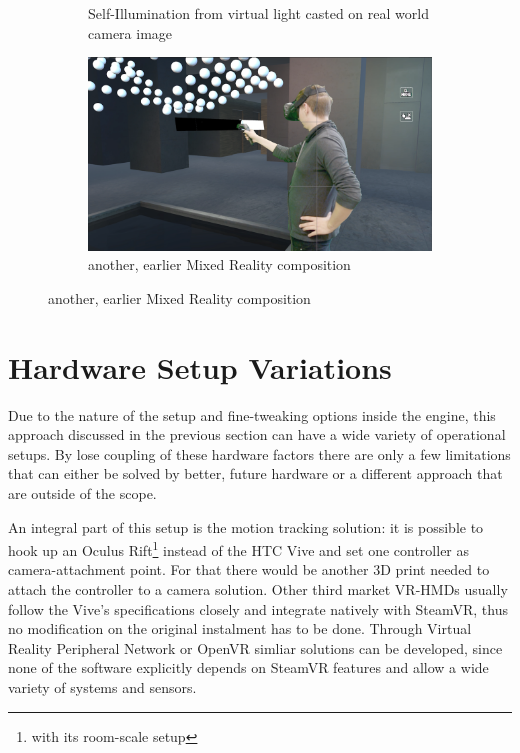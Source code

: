 \begin{figure}[htbp]
\begin{subfigure}[t]{.49\textwidth}
		\caption{Self-Illumination from virtual light casted on real world 
			camera image}
	\end{subfigure}
	\hfill
	\begin{subfigure}[t]{.49\textwidth}
		\centering
		\includegraphics[width=\textwidth]{gfx/results/mr-action_old.png}
		\caption{another, earlier Mixed Reality composition}
	\end{subfigure}
\end{figure}

\section{Hardware Setup Variations}
\label{sec:eval:hardware}

Due to the nature of the setup and fine-tweaking options inside the engine, 
this approach discussed in the previous section can have a wide variety of 
operational setups. By lose coupling of these hardware factors there are only a 
few limitations that can either be solved by better, future hardware or a 
different approach that are outside of the scope.

An integral part of this setup is the motion tracking solution: it is possible 
to hook up an Oculus Rift\footnote{with its room-scale setup} instead of the 
HTC Vive and set one controller as camera-attachment point. For that there 
would be another 3D print needed to attach the controller to a camera solution. 
\newline
Other third market VR-HMDs usually follow the Vive's specifications closely and 
integrate natively with SteamVR, thus no modification on the original 
instalment has to be done.
\newline
Through Virtual Reality Peripheral Network or OpenVR simliar solutions can be 
developed, since none of the software explicitly depends on SteamVR features 
and allow a wide variety of systems and sensors.

